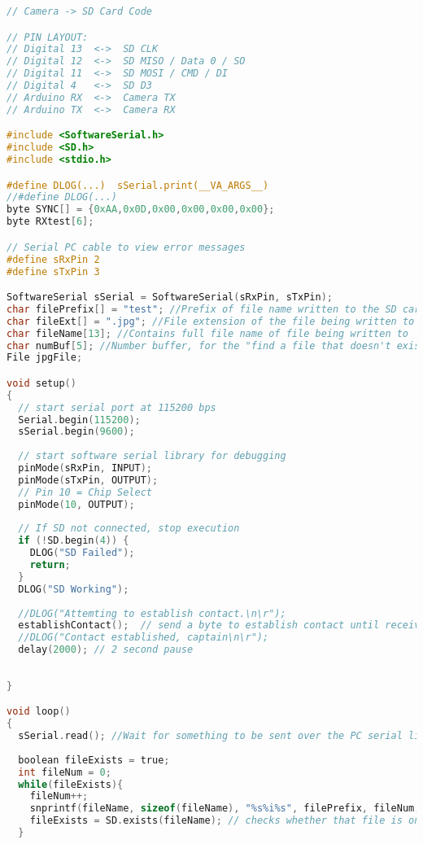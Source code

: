 \begin{lstlisting}[language=C, label = lst:arduino_captureTest, caption = {Arduino code, used up until the point we started using the Il Matto. This was written in the arduino-022 IDE}]
// Camera -> SD Card Code

// PIN LAYOUT:
// Digital 13  <->  SD CLK
// Digital 12  <->  SD MISO / Data 0 / SO
// Digital 11  <->  SD MOSI / CMD / DI
// Digital 4   <->  SD D3
// Arduino RX  <->  Camera TX
// Arduino TX  <->  Camera RX

#include <SoftwareSerial.h>
#include <SD.h>
#include <stdio.h>

#define DLOG(...)  sSerial.print(__VA_ARGS__)
//#define DLOG(...)
byte SYNC[] = {0xAA,0x0D,0x00,0x00,0x00,0x00};
byte RXtest[6];

// Serial PC cable to view error messages
#define sRxPin 2
#define sTxPin 3

SoftwareSerial sSerial = SoftwareSerial(sRxPin, sTxPin);
char filePrefix[] = "test"; //Prefix of file name written to the SD card
char fileExt[] = ".jpg"; //File extension of the file being written to
char fileName[13]; //Contains full file name of file being written to
char numBuf[5]; //Number buffer, for the "find a file that doesn't exist" procedure. Could be a number up to 32767
File jpgFile;

void setup()
{
  // start serial port at 115200 bps
  Serial.begin(115200);
  sSerial.begin(9600);
  
  // start software serial library for debugging
  pinMode(sRxPin, INPUT);
  pinMode(sTxPin, OUTPUT);
  // Pin 10 = Chip Select
  pinMode(10, OUTPUT);
  
  // If SD not connected, stop execution
  if (!SD.begin(4)) {
    DLOG("SD Failed");
    return;
  }
  DLOG("SD Working"); 
  
  //DLOG("Attemting to establish contact.\n\r");
  establishContact();  // send a byte to establish contact until receiver responds
  //DLOG("Contact established, captain\n\r"); 
  delay(2000); // 2 second pause
  
  
}

void loop()
{
  sSerial.read(); //Wait for something to be sent over the PC serial line
  
  boolean fileExists = true;
  int fileNum = 0;
  while(fileExists){
    fileNum++;
    snprintf(fileName, sizeof(fileName), "%s%i%s", filePrefix, fileNum, fileExt); // prints "test{num},jpg" to fileName
    fileExists = SD.exists(fileName); // checks whether that file is on the SD card.
  }
  

\end{lstlisting}
